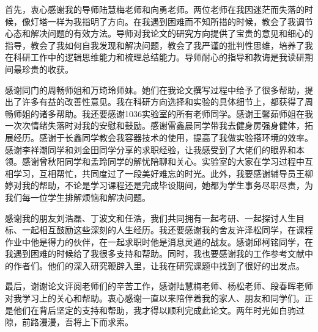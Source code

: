 
\begin{thanks}

首先，衷心感谢我的导师陆慧梅老师和向勇老师。两位老师在我因迷茫而失落的时候，像灯塔一样为我指明了方向。在我遇到困难而不知所措的时候，教会了我调节心态和解决问题的有效方法。导师对我论文的研究方向提供了宝贵的意见和细心的指导，教会了我如何自我发现和解决问题，教会了我严谨的批判性思维，培养了我在科研工作中的逻辑思维能力和梳理总结能力。导师耐心的指导和教诲是我读研期间最珍贵的收获。

感谢同门的周畅师姐和万琦玲师妹。她们在我论文撰写过程中给予了很多帮助，提出了许多有益的改善性意见。我在科研方向选择和实验的具体细节上，都获得了周畅师姐的诸多帮助。我还要感谢1036实验室的所有老师同学。感谢王馨茹师姐在我一次次情绪失落时对我的安慰和鼓励。感谢雷鑫晨同学带我去健身房强身健体，拓展经历。感谢于长鑫同学教会我容器技术的使用，提高了我做实验搭环境的效率。感谢李祥潮同学和刘金田同学分享的求职经验，让我感受到了大佬们的眼界和本领。感谢曾秋阳同学和孟玲同学的解忧陪聊和关心。实验室的大家在学习过程中互相学习，互相帮忙，共同度过了一段美好难忘的时光。此外，我要感谢辅导员王柳婷对我的帮助，不论是学习课程还是完成毕设期间，她都为学生事务尽职尽责，为我们每一位学生排解烦恼和解决问题。

感谢我的朋友刘浩磊、丁波文和任浩，我们共同拥有一起考研、一起探讨人生目标、一起相互鼓励这些深刻的人生经历。我还要感谢我的舍友许泽松同学，在课程作业中他是得力的伙伴，在一起求职时他是消息灵通的战友。感谢邱柯铭同学，在我遇到困难的时候给了我很多支持和帮助。同时，我也要感谢我的工作参考文献中的作者们。他们的深入研究鞭辟入里，让我在研究课题中找到了很好的出发点。

最后，谢谢论文评阅老师们的辛苦工作，感谢陆慧梅老师、杨松老师、段春晖老师对我学习上的关心和帮助。衷心感谢一直以来陪伴着我的家人、朋友和同学们。正是他们在背后坚定的支持和帮助，我才得以顺利完成此论文。两年时光如白驹过隙，前路漫漫，吾将上下而求索。

\end{thanks}
